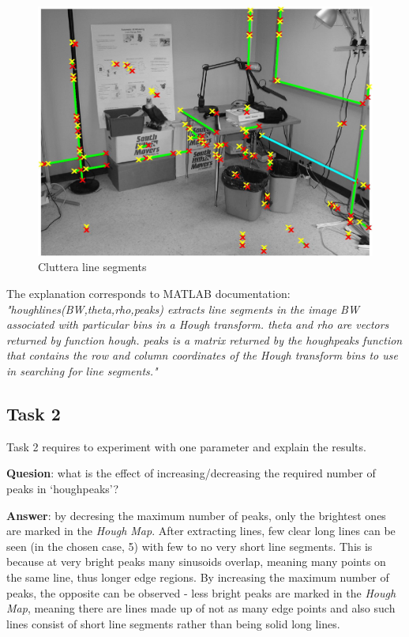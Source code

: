 \documentclass[lettersize,journal]{IEEEtran}
\begin{document}
\begin{figure}[h]
    \centering
    \includegraphics[width=0.8\linewidth]{hough_lines_10}
    \caption{Cluttera line segments}
    \label{fig:4}
\end{figure}

The explanation corresponds to MATLAB documentation: \emph{"houghlines(BW,theta,rho,peaks) extracts line segments in the image BW associated with particular bins in a Hough transform. theta and rho are vectors returned by function hough. peaks is a matrix returned by the houghpeaks function that contains the row and column coordinates of the Hough transform bins to use in searching for line segments."}

\subsection{Task 2}

\noindent Task 2 requires to experiment with one parameter and explain the results.

\hfill

\noindent\textbf{Quesion}: what is the effect of increasing/decreasing the required number of peaks in ‘houghpeaks’?

\hfill

\noindent\textbf{Answer}: by decresing the maximum number of peaks, only the brightest ones are marked in the \emph{Hough Map}. After extracting lines, few clear long lines can be seen (in the chosen case, 5) with few to no very short line segments. This is because at very bright peaks many sinusoids overlap, meaning many points on the same line, thus longer edge regions. By increasing the maximum number of peaks, the opposite can be observed - less bright peaks are marked in the \emph{Hough Map}, meaning there are lines made up of not as many edge points and also such lines consist of short line segments rather than being solid long lines.
\end{document}

